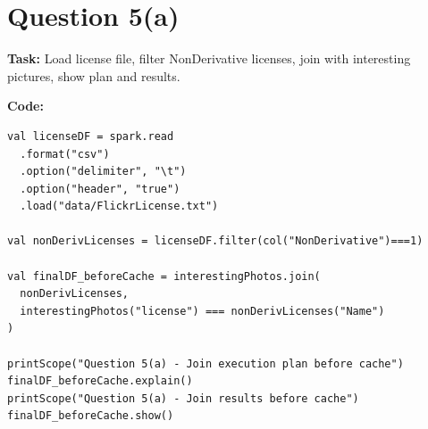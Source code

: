 \documentclass[11pt]{article}
\begin{document}
\section*{Question 5(a)}
\textbf{Task:} Load license file, filter NonDerivative licenses, join with interesting pictures, show plan and results.

\textbf{Code:}
\begin{lstlisting}
val licenseDF = spark.read
  .format("csv")
  .option("delimiter", "\t")
  .option("header", "true")
  .load("data/FlickrLicense.txt")

val nonDerivLicenses = licenseDF.filter(col("NonDerivative")===1)

val finalDF_beforeCache = interestingPhotos.join(
  nonDerivLicenses,
  interestingPhotos("license") === nonDerivLicenses("Name")
)

printScope("Question 5(a) - Join execution plan before cache")
finalDF_beforeCache.explain()
printScope("Question 5(a) - Join results before cache")
finalDF_beforeCache.show()
\end{lstlisting}
\end{document}
